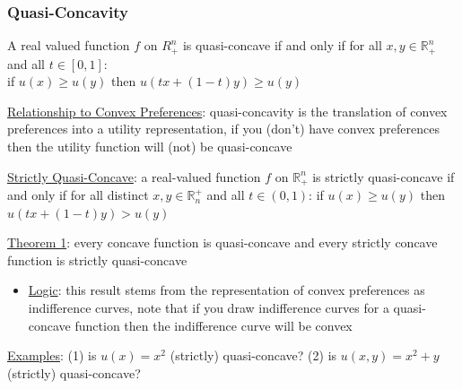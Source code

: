 \documentclass{article}
\begin{document}
\subsubsection{Quasi-Concavity}
A real valued function $f$ on $R_{+}^{n}$ is quasi-concave if and only if for all $x, y \in \mathbb{R}_{+}^{n}$ and all $t \in [0,1]$: \\ if $u(x) \geq u(y)$ then $u(tx + (1-t)y) \geq u(y)$ \par \vspace{0.3em}
  \underline{Relationship to Convex Preferences}: quasi-concavity is the translation of convex preferences into a utility representation, if you (don't) have convex preferences then the utility function will (not) be quasi-concave \par
  \underline{Strictly Quasi-Concave}: a real-valued function $f$ on $\mathbb{R}_{+}^{n}$ is strictly quasi-concave if and only if for all distinct $x, y \in \mathbb{R}^{+}_{n}$ and all $t \in (0,1)$: if $u(x) \geq u(y)$ then $u(tx + (1-t)y) > u(y)$
  \par
  \underline{Theorem 1}: every concave function is quasi-concave and every strictly concave function is strictly quasi-concave
  \begin{itemize}
    \item  \underline{Logic}: this result stems from the representation of convex preferences as indifference curves, note that if you draw indifference curves for a quasi-concave function then the indifference curve will be convex
  \end{itemize}
  \par
  \underline{Examples}: (1) is $u(x) = x^{2}$ (strictly) quasi-concave? (2) is $u(x,y) = x^{2} + y$ (strictly) quasi-concave?
\end{document}
